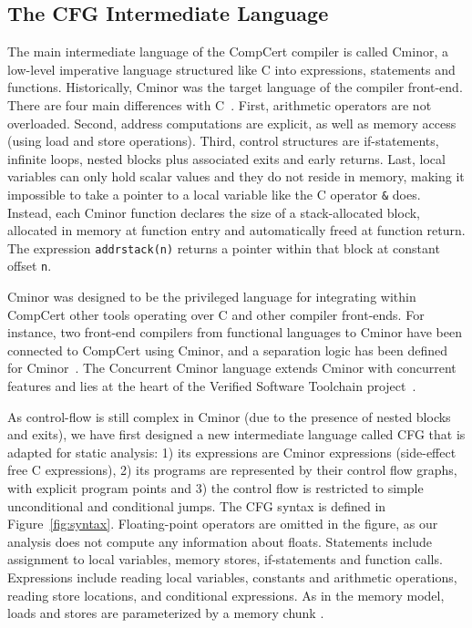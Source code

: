 \subsection{The CFG Intermediate Language}

The main intermediate language of the CompCert compiler is called
Cminor, a low-level imperative language structured like C into
expressions, statements and functions. Historically, Cminor was the target
language of the compiler front-end. There are four main differences
with C~\cite{Leroy-backend}. First, arithmetic operators are not
overloaded. Second, address computations are explicit, as well as memory access
(using load and store operations). Third, control
structures are if-statements, infinite loops, nested blocks
plus associated exits and early returns. Last, local variables can only
hold scalar values and they do not reside in memory, making it
impossible to take a pointer to a local variable like the C operator
{\tt \&} does. Instead, each Cminor function declares the size of a
stack-allocated block, allocated in memory at function entry and
automatically freed at function return. 
The expression \lstinline!addrstack(n)! returns a pointer within that
block at constant offset \lstinline!n!.


Cminor was designed to be the privileged language for integrating within
CompCert other tools operating over C and other compiler front-ends. For
instance, two front-end compilers from functional languages to Cminor
have been connected to CompCert using Cminor, and a separation logic
has been defined for Cminor~\cite{Appel-Blazy-07}. 
The Concurrent Cminor language extends Cminor with concurrent features
and lies at the heart of the Verified Software Toolchain project~\cite{VST}.

As control-flow is still complex in Cminor (due to the presence of
nested blocks and exits), we have first designed a new
intermediate language called CFG that is adapted for static analysis:
1) its expressions are Cminor expressions (\ie side-effect free
C expressions), 2) its programs are represented by their control flow graphs, with
explicit program points and 3) the control flow is restricted to
simple unconditional and conditional jumps.
The CFG syntax is defined in Figure~\ref{fig:syntax}. Floating-point operators
are omitted in the figure, as our analysis does not compute any information about floats.
Statements include assignment to local variables, memory stores,
if-statements and function calls. 
Expressions include reading local variables, constants and arithmetic
operations, reading store locations, and conditional expressions. 
As in the memory model, loads and stores are parameterized by a memory
chunk .

